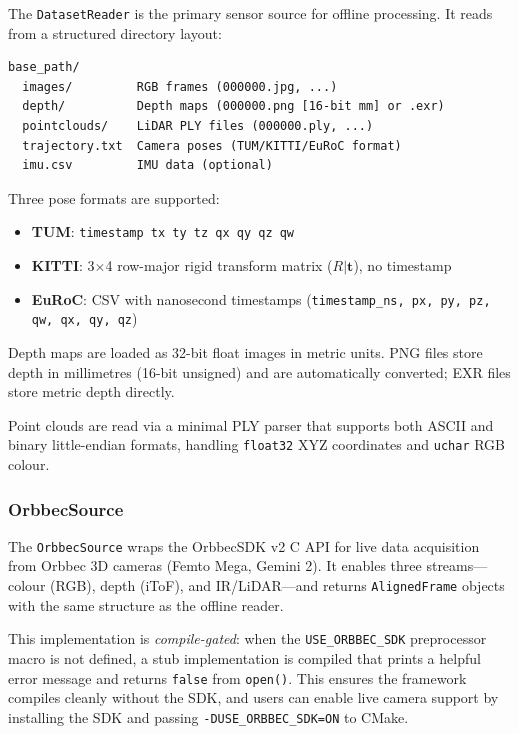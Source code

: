 The \texttt{DatasetReader} is the primary sensor source for offline
processing. It reads from a structured directory layout:

\begin{verbatim}
base_path/
  images/         RGB frames (000000.jpg, ...)
  depth/          Depth maps (000000.png [16-bit mm] or .exr)
  pointclouds/    LiDAR PLY files (000000.ply, ...)
  trajectory.txt  Camera poses (TUM/KITTI/EuRoC format)
  imu.csv         IMU data (optional)
\end{verbatim}

Three pose formats are supported:
\begin{itemize}
    \item \textbf{TUM}: \texttt{timestamp tx ty tz qx qy qz qw}
    \item \textbf{KITTI}: 3$\times$4 row-major rigid transform matrix
    ($R | \mathbf{t}$), no timestamp
    \item \textbf{EuRoC}: CSV with nanosecond timestamps
    (\texttt{timestamp\_ns, px, py, pz, qw, qx, qy, qz})
\end{itemize}

Depth maps are loaded as 32-bit float images in metric units. PNG files
store depth in millimetres (16-bit unsigned) and are automatically
converted; EXR files store metric depth directly.

Point clouds are read via a minimal PLY parser that supports both ASCII
and binary little-endian formats, handling \texttt{float32} XYZ coordinates
and \texttt{uchar} RGB colour.

\subsubsection{OrbbecSource}

The \texttt{OrbbecSource} wraps the OrbbecSDK v2 C API for live data
acquisition from Orbbec 3D cameras (Femto Mega, Gemini 2). It enables
three streams---colour (RGB), depth (iToF), and IR/LiDAR---and returns
\texttt{AlignedFrame} objects with the same structure as the offline
reader.

This implementation is \emph{compile-gated}: when the
\texttt{USE\_ORBBEC\_SDK} preprocessor macro is not defined, a stub
implementation is compiled that prints a helpful error message and
returns \texttt{false} from \texttt{open()}. This ensures the framework
compiles cleanly without the SDK, and users can enable live camera
support by installing the SDK and passing
\texttt{-DUSE\_ORBBEC\_SDK=ON} to CMake.

